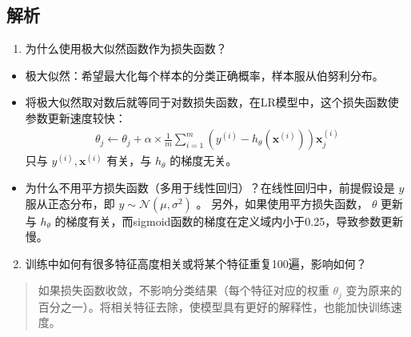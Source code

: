 \documentclass[letterpaper,10pt,english]{sphinxmanual}
\begin{document}
\subsection{解析}
\label{\detokenize{machineLearning/01_lr:id4}}\begin{enumerate}
\item {} 
为什么使用极大似然函数作为损失函数？

\end{enumerate}
\begin{itemize}
\item {} 
极大似然：希望最大化每个样本的分类正确概率，样本服从伯努利分布。

\item {} 
将极大似然取对数后就等同于对数损失函数，在LR模型中，这个损失函数使参数更新速度较快：
\begin{equation*}
\begin{split}\theta_j \leftarrow \theta_j + \alpha \times \frac{1}{m} \sum_{i=1}^m (y^{(i)} - h_\theta(\mathbf{x}^{(i)}))\mathbf{x}_j^{(i)}\end{split}
\end{equation*}
只与 \(y^{(i)},\mathbf{x}^{(i)}\) 有关，与 \(h_\theta\) 的梯度无关。

\item {} 
为什么不用平方损失函数（多用于线性回归）？在线性回归中，前提假设是 \(y\) 服从正态分布，即 \(y \sim \mathcal{N}(\mu, \sigma^2)\) 。
另外，如果使用平方损失函数， \(\theta\) 更新与 \(h_\theta\) 的梯度有关，而sigmoid函数的梯度在定义域内小于0.25，导致参数更新慢。

\end{itemize}
\begin{enumerate}
\setcounter{enumi}{1}
\item {} 
训练中如何有很多特征高度相关或将某个特征重复100遍，影响如何？

\end{enumerate}
\begin{quote}

如果损失函数收敛，不影响分类结果（每个特征对应的权重 \(\theta_j\) 变为原来的百分之一）。将相关特征去除，使模型具有更好的解释性，也能加快训练速度。
\end{quote}
\end{document}
